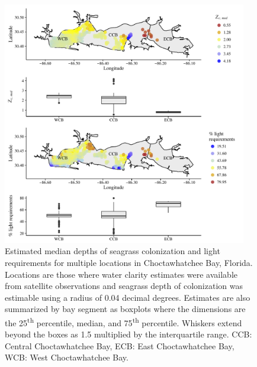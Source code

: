 \documentclass[letterpaper,12pt,oneside]{article}\usepackage[]{graphicx}\usepackage[]{color}
\begin{document}
\begin{figure}
\centering
\includegraphics[width = 0.95\textwidth]{figs/Fig7.pdf}
\caption{Estimated median depths of seagrass colonization and light requirements for multiple locations in Choctawhatchee Bay, Florida. Locations are those where water clarity estimates were available from satellite observations and seagrass depth of colonization was estimable using a radius of 0.04 decimal degrees.  Estimates are also summarized by bay segment as boxplots where the dimensions are the 25\textsuperscript{th} percentile, median, and 75\textsuperscript{th} percentile.  Whiskers extend beyond the boxes as 1.5 multiplied by the interquartile range. CCB: Central Choctawhatchee Bay, ECB: East Choctawhatchee Bay, WCB: West Choctawhatchee Bay.}
\label{fig:light_choc}
\end{figure}

\end{document}
